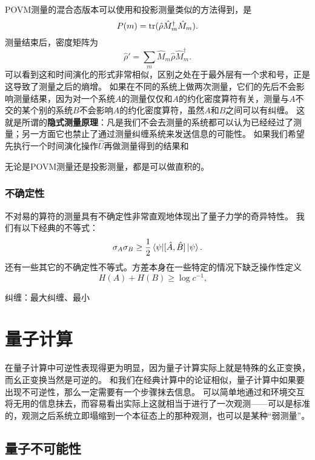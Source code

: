 \documentclass[UTF8, a4paper]{ctexart}
\begin{document}
POVM测量的混合态版本可以使用和投影测量类似的方法得到，是
\begin{equation}
    P(m) = \trace(\hat{\rho} \hat{M}^\dagger_m \hat{M}_m).
\end{equation}
测量结束后，密度矩阵为
\begin{equation}
    \hat{\rho}' = \sum_m \hat{M}_m \hat{\rho} \hat{M}_m^\dagger.
\end{equation}
可以看到这和时间演化的形式非常相似，区别之处在于最外层有一个求和号，正是这导致了测量之后的熵增。
如果在不同的系统上做两次测量，它们的先后不会影响测量结果，因为对一个系统$A$的测量仅仅和$A$的约化密度算符有关，测量与$A$不交的某个别的系统$B$不会影响$A$的约化密度算符，虽然$A$和$B$之间可以有纠缠。
这就是所谓的\textbf{隐式测量原理}：凡是我们不会去测量的系统都可以认为已经经过了测量；另一方面它也禁止了通过测量纠缠系统来发送信息的可能性。
如果我们希望先执行一个时间演化操作$\hat{U}$再做测量得到的结果和

无论是POVM测量还是投影测量，都是可以做直积的。

\subsubsection{不确定性}

不对易的算符的测量具有不确定性非常直观地体现出了量子力学的奇异特性。
我们有以下经典的不等式：
\begin{equation}
    \sigma_{A} \sigma_{B} \geq \frac{1}{2} \mel{\psi}{\comm*{\hat{A}}{\hat{B}}}{\psi}.
\end{equation}
还有一些其它的不确定性不等式。方差本身在一些特定的情况下缺乏操作性定义
\begin{equation}
    H(A) + H(B) \geq \log c^{-1}, \quad 
\end{equation}

纠缠：最大纠缠、最小

\section{量子计算}

在量子计算中可逆性表现得更为明显，因为量子计算实际上就是特殊的幺正变换，而幺正变换当然是可逆的。
和我们在经典计算中的论证相似，量子计算中如果要出现不可逆性，那么一定需要有一个步骤抹去信息。
可以简单地通过和环境交互将无用的信息抹去，而容易看出实际上这就相当于进行了一次观测——可以是标准的，观测之后系统立即塌缩到一个本征态上的那种观测，也可以是某种“弱测量”。

\subsection{量子不可能性}
\end{document}
